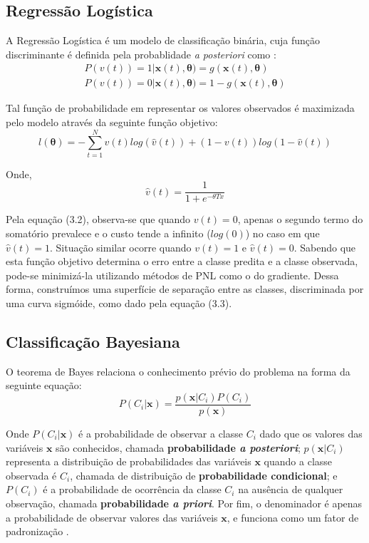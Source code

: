 \documentclass{homework}
\begin{document}
\subsection{Regressão Logística}

A Regressão Logística é um modelo de classificação binária, cuja função discriminante é definida pela probablidade
\textit{a posteriori} como \cite{evsukoff}:
\begin{equation}
    \begin{split}
        P(v(t)) = 1|\mathbf{x}(t),\mathbf{\theta}) = g(\mathbf{x}(t),\mathbf{\theta}) \\
        P(v(t)) = 0|\mathbf{x}(t),\mathbf{\theta}) = 1 - g(\mathbf{x}(t),\mathbf{\theta})
    \end{split}
\end{equation}

Tal função de probabilidade em representar os valores observados é maximizada pelo modelo através da seguinte função
objetivo:
\begin{equation}
    l(\mathbf{\theta}) = - \sum_{t=1}^{N}v(t)log(\hat{v}(t)) + (1-v(t))log(1-\hat{v}(t))
\end{equation}

Onde,
\begin{equation}
    \hat{v}(t) = \frac{1}{1+e^{-\theta T x}}
\end{equation}

Pela equação (3.2), observa-se que quando $v(t) = 0$, apenas o segundo termo do somatório prevalece e o custo
tende a infinito ($log(0)$) no caso em que $\hat{v}(t) = 1$. Situação similar ocorre quando $v(t) = 1$ e $\hat{v}(t)=0$.
Sabendo que esta função objetivo determina o erro entre a classe predita e a classe observada, pode-se minimizá-la
utilizando métodos de PNL como o do gradiente. Dessa forma, construímos uma superfície de separação entre as classes,
discriminada por uma curva sigmóide, como dado pela equação (3.3).

\subsection{Classificação Bayesiana}

O teorema de Bayes relaciona o conhecimento prévio do problema na forma da seguinte equação:
\begin{equation}
    P(C_i|\mathbf{x}) = \frac{p(\mathbf{x}|C_i)P(C_i)}{p(\mathbf{x})}
\end{equation}

Onde $P(C_i|\mathbf{x})$ é a probabilidade de observar a classe $C_i$ dado que os valores das variáveis $\mathbf{x}$ são
conhecidos, chamada \textbf{probabilidade \textit{a posteriori}}; $p(\mathbf{x}|C_i)$ representa a distribuição de
probabilidades das variáveis $\mathbf{x}$ quando a classe observada é $C_i$, chamada de distribuição de 
\textbf{probabilidade condicional}; e $P(C_i)$ é a probabilidade de ocorrência da classe $C_i$ na ausência de qualquer
observação, chamada \textbf{probabilidade \textit{a priori}}. Por fim, o denominador é apenas a probabilidade de
observar valores das variáveis $\mathbf{x}$, e funciona como um fator de padronização \cite{evsukoff}.
\end{document}
